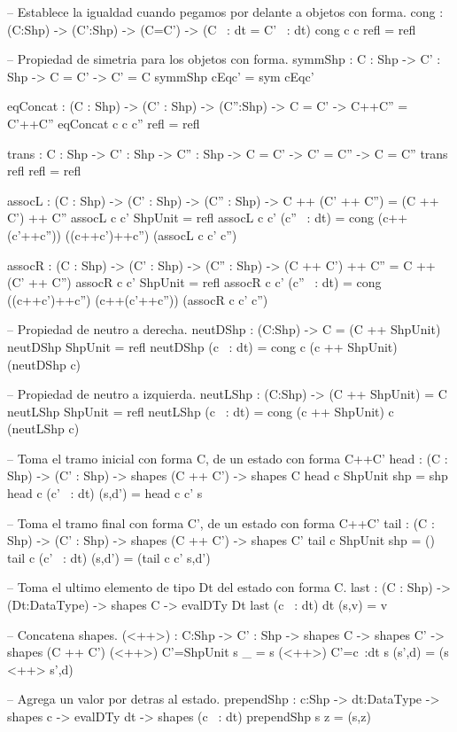 \begin{code}
-- Establece la igualdad cuando pegamos por delante a objetos con forma.
cong : (C:Shp) -> (C':Shp) -> (C=C') -> (C ~: dt = C' ~: dt)
cong c c refl = refl

-- Propiedad de simetria para los objetos con forma.
symmShp : {C : Shp} -> {C' : Shp} -> C = C' -> C' = C
symmShp cEqc' = sym cEqc'

eqConcat : (C : Shp) -> (C' : Shp) -> (C'':Shp) -> C = C' -> C++C'' = C'++C''
eqConcat c c c'' refl = refl

trans : {C : Shp} -> {C' : Shp} -> {C'' : Shp} -> C = C' -> C' = C'' -> C = C''
trans refl refl = refl

assocL : (C : Shp) -> (C' : Shp) -> (C'' : Shp) -> C ++ (C' ++ C'') = (C ++ C') ++ C''
assocL c c' ShpUnit = refl
assocL c c' (c'' ~: dt) = cong (c++(c'++c'')) ((c++c')++c'') (assocL c c' c'')

assocR : (C : Shp) -> (C' : Shp) -> (C'' : Shp) -> (C ++ C') ++ C'' = C ++ (C' ++ C'')
assocR c c' ShpUnit = refl
assocR c c' (c'' ~: dt) = cong ((c++c')++c'') (c++(c'++c'')) (assocR c c' c'')

-- Propiedad de neutro a derecha.
neutDShp : (C:Shp) -> C = (C ++ ShpUnit)
neutDShp ShpUnit = refl
neutDShp (c ~: dt) = cong c (c ++ ShpUnit) (neutDShp c)

-- Propiedad de neutro a izquierda.
neutLShp : (C:Shp) -> (C ++ ShpUnit) = C
neutLShp ShpUnit = refl
neutLShp (c ~: dt) = cong (c ++ ShpUnit) c (neutLShp c)

-- Toma el tramo inicial con forma C, de un estado con forma C++C'
head : (C : Shp) -> (C' : Shp) -> shapes (C ++ C') -> shapes C
head c ShpUnit shp = shp
head c (c' ~: dt) (s,d') = head c c' s

-- Toma el tramo final con forma C', de un estado con forma C++C'
tail : (C : Shp) -> (C' : Shp) -> shapes (C ++ C') -> shapes C'
tail c ShpUnit shp = ()
tail c (c' ~: dt) (s,d')  = (tail c c' s,d')

-- Toma el ultimo elemento de tipo Dt del estado con forma C.
last : (C : Shp) -> (Dt:DataType) -> shapes C -> evalDTy Dt
last (c ~: dt) dt (s,v) = v

-- Concatena shapes.
(<++>) : {C:Shp} -> {C' : Shp} -> shapes C -> shapes C' -> shapes (C ++ C')
(<++>) {C'=ShpUnit} s _ = s
(<++>) {C'=c~:dt} s (s',d) = (s <++> s',d)

-- Agrega un valor por detras al estado.
prependShp : {c:Shp} -> {dt:DataType} -> 
            shapes c -> evalDTy dt -> shapes (c ~: dt)
prependShp s z = (s,z)


\end{code}
